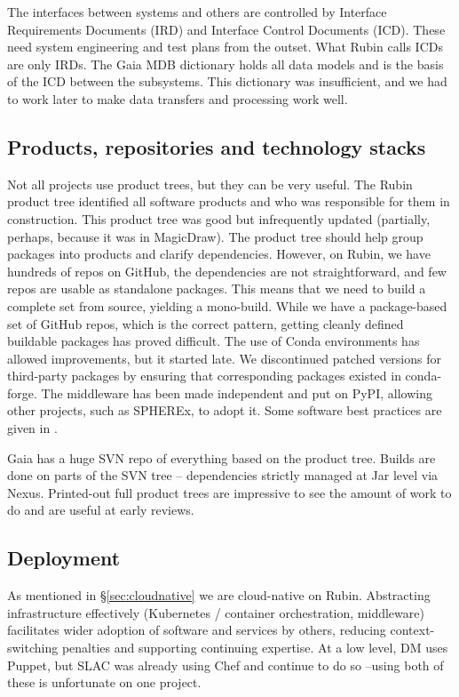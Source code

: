 \documentclass[11pt,twoside]{article}
\begin{document}
The interfaces between systems and others are controlled by Interface Requirements Documents (IRD) and Interface Control Documents (ICD).
These need system engineering and test plans from the outset.
What Rubin calls ICDs are only IRDs.
The Gaia MDB dictionary holds all data models \citep{2015ASPC..495...47H, 2011ASPC..442..351O} and is the basis of the ICD between the subsystems.
This dictionary was insufficient, and we had to work later to make data transfers and processing work well.

\subsection{Products, repositories and technology stacks}

Not all projects use product trees, but they can be very useful.
The Rubin product tree identified all software products and who was responsible for them in construction.
This product tree was good but infrequently updated (partially, perhaps, because it was in MagicDraw).
The product tree should help group packages into products and clarify dependencies.
However, on Rubin, we have hundreds of repos on GitHub, the dependencies are not straightforward, and few repos are usable as standalone packages.
This means that we need to build a complete set from source, yielding a
 mono-build.
 While we have a package-based set of GitHub repos, which is the correct pattern, getting cleanly defined buildable packages has proved difficult.
The use of Conda environments has allowed improvements, but it started late.
We discontinued patched versions for third-party packages by ensuring that corresponding packages existed in conda-forge.
The middleware has been made independent and put on PyPI, allowing other projects, such as SPHEREx, to adopt it.
Some software best practices are given in \citet{2018SPIE10707E..09J}.

Gaia has a huge SVN repo of everything based on the product tree. Builds are done on parts of the SVN tree -- dependencies strictly managed at Jar level via Nexus.
Printed-out full product trees are impressive to see the amount of work to do and are useful at early reviews.

\subsection{Deployment}
As mentioned in \S\ref{sec:cloudnative} we are cloud-native on Rubin.
Abstracting infrastructure effectively (Kubernetes / container orchestration, middleware) facilitates wider adoption of software and services by others, reducing context-switching penalties and supporting continuing expertise.
At a low level, DM uses Puppet, but SLAC was already using Chef and continue to do so --using both of these is unfortunate on one project.
\end{document}

